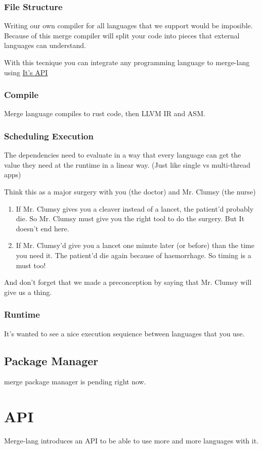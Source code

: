 \documentclass[9pt,twocolumn]{article}
\begin{document}
\subsubsection{File Structure}
\label{sec:org0830e2a}
Writing our own compiler for all languages that we support would be imposible. Because of this merge compiler will split your code into pieces that external languages can understand.

With this tecnique you can integrate any programming language to merge-lang using \hyperref[sec:org2a5f573]{It's API}


\subsubsection{Compile}
\label{sec:org1e433a3}
Merge language compiles to rust code, then LLVM IR and ASM.

\subsubsection{Scheduling Execution}
\label{sec:org1f184bc}

The dependencies need to evaluate in a way that every language can get the value they need at the runtime in a linear way. (Just like single vs multi-thread apps)

Think this as a major surgery with you (the doctor) and Mr. Clumsy (the nurse)

\begin{enumerate}
\item If Mr. Clumsy gives you a cleaver instead of a lancet, the patient'd probably die. So Mr. Clumsy must give you the right tool to do the surgery. But It doesn't end here.
\item If Mr. Clumsy'd give you a lancet one minute later (or before) than the time you need it. The patient'd die again because of haemorrhage. So timing is a must too!
\end{enumerate}

And don't forget that we made a preconception by saying that Mr. Clumsy will give us a thing.

\subsubsection{Runtime}
\label{sec:org7a79cb4}
It's wanted to see a nice execution sequience between languages that you use.

\subsection{Package Manager}
\label{sec:orga2e00a9}
merge package manager is pending right now.

\section{API}
\label{sec:org2a5f573}
Merge-lang introduces an API to be able to use more and more languages with it.
\end{document}
